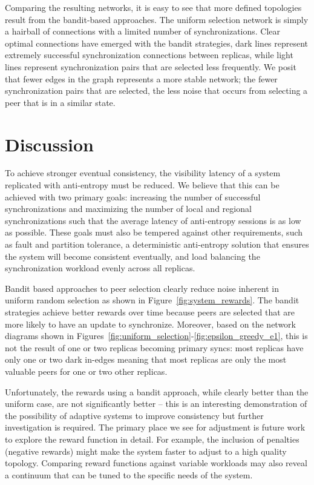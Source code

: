 Comparing the resulting networks, it is easy to see that more defined
topologies result from the bandit-based approaches.
The uniform selection network is simply a hairball of connections with
a limited number of synchronizations.
Clear optimal connections have emerged with the bandit strategies, dark
lines represent extremely successful synchronization connections between
replicas, while light lines represent synchronization pairs that are
selected less frequently.
We posit that fewer edges in the graph represents a more stable network;
the fewer synchronization pairs that are selected, the less noise that
occurs from selecting a peer that is in a similar state.

\section*{Discussion}

To achieve stronger eventual consistency, the visibility latency
of a system replicated with anti-entropy must be reduced.
We believe that this can be achieved with two primary goals: increasing
the number of successful synchronizations and maximizing the number
of local and regional synchronizations such that the average latency of
anti-entropy sessions is as low as possible.
These goals must also be tempered against other requirements, such as
fault and partition tolerance, a deterministic anti-entropy solution that
ensures the system will become consistent eventually, and load balancing
the synchronization workload evenly across all replicas.

Bandit based approaches to peer selection clearly reduce noise inherent
in uniform random selection as shown in Figure~\ref{fig:system_rewards}.
The bandit strategies achieve better rewards over time because peers
are selected that are more likely to have an update to synchronize.
Moreover, based on the network diagrams shown in
Figures~\ref{fig:uniform_selection}-\ref{fig:epsilon_greedy_e1}, this is
not the result of one or two replicas becoming primary syncs: most
replicas have only one or two dark in-edges meaning that most replicas
are only the most valuable peers for one or two other replicas.

Unfortunately, the rewards using a bandit approach, while clearly better
than the uniform case, are not significantly better -- this is an interesting
demonstration of the possibility of adaptive systems to improve consistency
but further investigation is required.
The primary place we see for adjustment is future work to explore the reward
function in detail.
For example, the inclusion of penalties (negative rewards) might make
the system faster to adjust to a high quality topology.
Comparing reward functions against variable workloads may also reveal a
continuum that can be tuned to the specific needs of the system.

